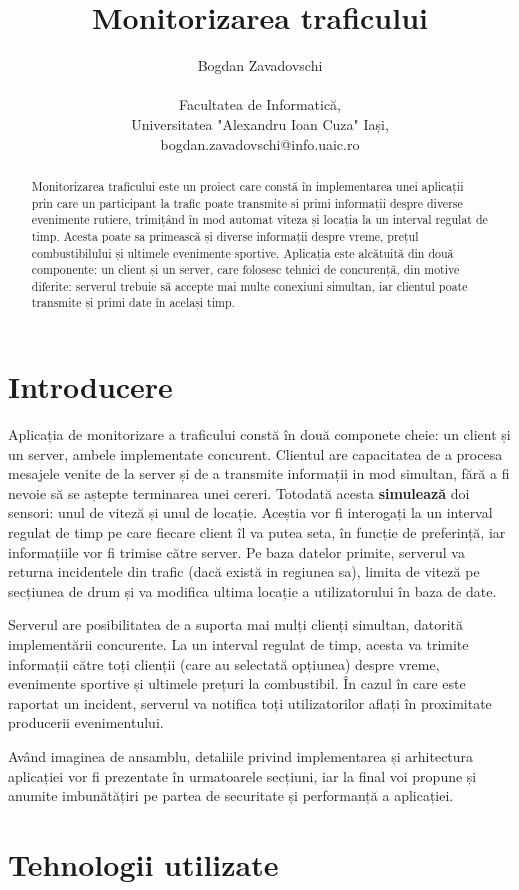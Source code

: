 \documentclass{article}
\author{Bogdan Zavadovschi \protect\\ 
\protect\\
\small Facultatea de Informatică, 
\protect\\
\small Universitatea "Alexandru Ioan Cuza" Iași,
\protect\\ 
\small bogdan.zavadovschi@info.uaic.ro}
\title{
    \textbf{Monitorizarea traficului} 
}
\date{}
\begin{document}
\maketitle
\begin{abstract}
    Monitorizarea traficului este un proiect care constă în implementarea unei aplicații prin care un participant la trafic poate transmite si primi informații despre diverse evenimente rutiere, trimițând în mod automat viteza și locația la un interval regulat de timp. Acesta poate sa primească și diverse informații despre vreme, prețul combustibilului și ultimele evenimente sportive. Aplicația este alcătuită din două componente: un client și un server, care folosesc tehnici de concurență, din motive diferite: serverul trebuie să accepte mai multe conexiuni simultan, iar clientul poate transmite și primi date în același timp.
\end{abstract}
\section{Introducere}
Aplicația de monitorizare a traficului constă în două componete cheie: un client și un server, ambele implementate concurent. Clientul are capacitatea de a procesa mesajele venite de la server și de a transmite informații in mod simultan, fără a fi nevoie să se aștepte terminarea unei cereri. Totodată acesta \textbf{simulează} doi sensori: unul de viteză și unul de locație. Aceștia vor fi interogați la un interval regulat de timp pe care fiecare client îl va putea seta, în funcție de preferință, iar informațiile vor fi trimise către server. Pe baza datelor primite, serverul va returna incidentele din trafic (dacă există in regiunea sa), limita de viteză pe secțiunea de drum și va modifica ultima locație a utilizatorului în baza de date.

Serverul are posibilitatea de a suporta mai mulți clienți simultan, datorită implementării concurente. La un interval regulat de timp, acesta va trimite informații către toți clienții (care au selectată opțiunea) despre vreme, evenimente sportive și ultimele prețuri la combustibil. În cazul în care este raportat un incident, serverul va notifica toți utilizatorilor aflați în proximitate producerii evenimentului.   

Având imaginea de ansamblu, detaliile privind implementarea și arhitectura aplicației vor fi prezentate în urmatoarele secțiuni, iar la final voi propune și anumite imbunătățiri pe partea de securitate și performanță a aplicației. 
\section{Tehnologii utilizate}
\end{document}
